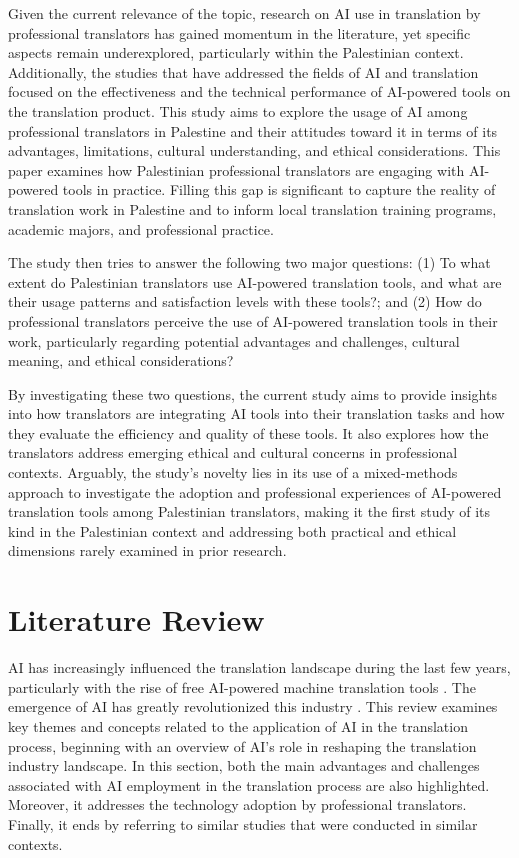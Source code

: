 \documentclass[english]{textolivre}
\begin{document}
Given the current relevance of the topic, research on AI use in translation by professional translators has gained momentum in the literature, yet specific aspects remain underexplored, particularly within the Palestinian context. Additionally, the studies that have addressed the fields of AI and translation focused on the effectiveness and the technical performance of AI-powered tools on the translation product. This study aims to explore the usage of AI among professional translators in Palestine and their attitudes toward it in terms of its advantages, limitations, cultural understanding, and ethical considerations. This paper examines how Palestinian professional translators are engaging with AI-powered tools in practice. Filling this gap is significant to capture the reality of translation work in Palestine and to inform local translation training programs, academic majors, and professional practice.

The study then tries to answer the following two major questions: (1) To what extent do Palestinian translators use AI-powered translation tools, and what are their usage patterns and satisfaction levels with these tools?; and (2) How do professional translators perceive the use of AI-powered translation tools in their work, particularly regarding potential advantages and challenges, cultural meaning, and ethical considerations?

By investigating these two questions, the current study aims to provide insights into how translators are integrating AI tools into their translation tasks and how they evaluate the efficiency and quality of these tools. It also explores how the translators address emerging ethical and cultural concerns in professional contexts. Arguably, the study’s novelty lies in its use of a mixed-methods approach to investigate the adoption and professional experiences of AI-powered translation tools among Palestinian translators, making it the first study of its kind in the Palestinian context and addressing both practical and ethical dimensions rarely examined in prior research.

\section{Literature Review}\label{sec-normas}
AI has increasingly influenced the translation landscape during the last few years, particularly with the rise of free AI-powered machine translation tools \cite{OmarSalih2024Postediting}. The emergence of AI has greatly revolutionized this industry \cite{MohamedEtAl2024AITranslationReview}. This review examines key themes and concepts related to the application of AI in the translation process, beginning with an overview of AI’s role in reshaping the translation industry landscape. In this section, both the main advantages and challenges associated with AI employment in the translation process are also highlighted. Moreover, it addresses the technology adoption by professional translators. Finally, it ends by referring to similar studies that were conducted in similar contexts.
\end{document}
